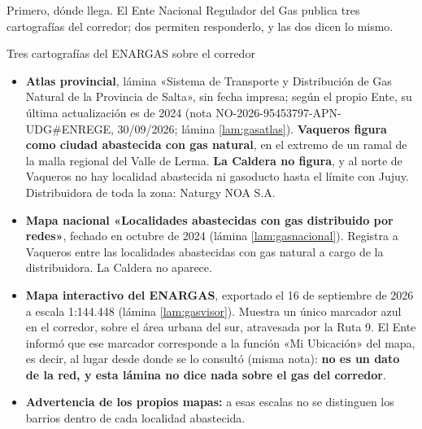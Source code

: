 Primero, dónde llega. El Ente Nacional Regulador del Gas publica tres cartografías del corredor; dos permiten responderlo, y las dos dicen lo mismo.

\begin{ficha}{Tres cartografías del ENARGAS sobre el corredor}
\begin{itemize}[leftmargin=*,nosep]
\item \textbf{Atlas provincial}, lámina «Sistema de Transporte y Distribución de Gas Natural de la Provincia de Salta», sin fecha impresa; según el propio Ente, su última actualización es de 2024 (nota NO-2026-95453797-APN-UDG\#ENREGE, 30/09/2026; lámina \ref{lam:gasatlas}). \textbf{Vaqueros figura como ciudad abastecida con gas natural}, en el extremo de un ramal de la malla regional del Valle de Lerma. \textbf{La Caldera no figura}, y al norte de Vaqueros no hay localidad abastecida ni gasoducto hasta el límite con Jujuy. Distribuidora de toda la zona: Naturgy NOA S.A.
\item \textbf{Mapa nacional «Localidades abastecidas con gas distribuido por redes»}, fechado en octubre de 2024 (lámina \ref{lam:gasnacional}). Registra a Vaqueros entre las localidades abastecidas con gas natural a cargo de la distribuidora. La Caldera no aparece.
\item \textbf{Mapa interactivo del ENARGAS}, exportado el 16 de septiembre de 2026 a escala 1:144.448 (lámina \ref{lam:gasvisor}). Muestra un único marcador azul en el corredor, sobre el área urbana del sur, atravesada por la Ruta 9. El Ente informó que ese marcador corresponde a la función «Mi Ubicación» del mapa, es decir, al lugar desde donde se lo consultó (misma nota): \textbf{no es un dato de la red, y esta lámina no dice nada sobre el gas del corredor}.
\item \textbf{Advertencia de los propios mapas:} a esas escalas no se distinguen los barrios dentro de cada localidad abastecida.
\end{itemize}
\end{ficha}

